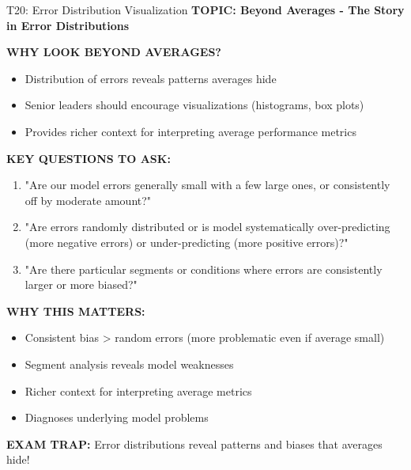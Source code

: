 \documentclass[8pt]{beamer}
\begin{document}
	\begin{frame}{T20: Error Distribution Visualization}
		\fontsize{6.5}{7.5}\selectfont
		\textbf{TOPIC: Beyond Averages - The Story in Error Distributions}
		
		\vspace{0.1cm}
		\textbf{WHY LOOK BEYOND AVERAGES?}
		\begin{itemize}
			\item Distribution of errors reveals patterns averages hide
			\item Senior leaders should encourage visualizations (histograms, box plots)
			\item Provides richer context for interpreting average performance metrics
		\end{itemize}
		
		\vspace{0.1cm}
		\textbf{KEY QUESTIONS TO ASK:}
		\begin{enumerate}
			\item "Are our model errors generally small with a few large ones, or consistently off by moderate amount?"
			\item "Are errors randomly distributed or is model systematically over-predicting (more negative errors) or under-predicting (more positive errors)?"
			\item "Are there particular segments or conditions where errors are consistently larger or more biased?"
		\end{enumerate}
		
		\vspace{0.1cm}
		\textbf{WHY THIS MATTERS:}
		\begin{itemize}
			\item \textcolor{myblue}{Consistent bias} > random errors (more problematic even if average small)
			\item Segment analysis reveals model weaknesses
			\item Richer context for interpreting average metrics
			\item Diagnoses underlying model problems
		\end{itemize}
		
		\textcolor{myred}{\textbf{EXAM TRAP:}} Error distributions reveal \textcolor{myblue}{patterns and biases} that averages hide!
	\end{frame}
	
\end{document}
